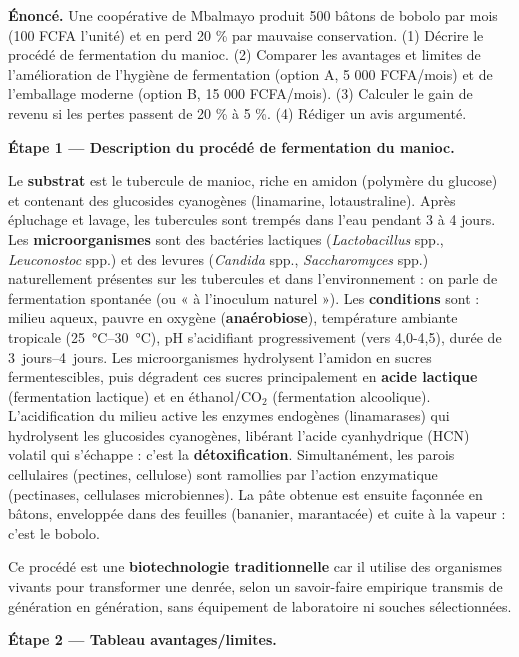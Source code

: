 \documentclass[11pt]{article}
\begin{document}
\begin{exoresolu}
\textbf{Énoncé.} Une coopérative de Mbalmayo produit 500 bâtons de bobolo par mois (100 FCFA l'unité) et en perd 20 \% par mauvaise conservation. (1) Décrire le procédé de fermentation du manioc. (2) Comparer les avantages et limites de l'amélioration de l'hygiène de fermentation (option A, 5 000 FCFA/mois) et de l'emballage moderne (option B, 15 000 FCFA/mois). (3) Calculer le gain de revenu si les pertes passent de 20 \% à 5 \%. (4) Rédiger un avis argumenté.

\tcblower

\textbf{Étape 1 — Description du procédé de fermentation du manioc.}

Le \textbf{substrat} est le tubercule de manioc, riche en amidon (polymère du glucose) et contenant des glucosides cyanogènes (linamarine, lotaustraline). Après épluchage et lavage, les tubercules sont trempés dans l'eau pendant 3 à 4 jours. Les \textbf{microorganismes} sont des bactéries lactiques (\emph{Lactobacillus} spp., \emph{Leuconostoc} spp.) et des levures (\emph{Candida} spp., \emph{Saccharomyces} spp.) naturellement présentes sur les tubercules et dans l'environnement : on parle de fermentation spontanée (ou « à l'inoculum naturel »). Les \textbf{conditions} sont : milieu aqueux, pauvre en oxygène (\textbf{anaérobiose}), température ambiante tropicale (\SIrange{25}{30}{\celsius}), pH s'acidifiant progressivement (vers 4,0-4,5), durée de \SIrange{3}{4}{jours}. Les microorganismes hydrolysent l'amidon en sucres fermentescibles, puis dégradent ces sucres principalement en \textbf{acide lactique} (fermentation lactique) et en éthanol/CO$_2$ (fermentation alcoolique). L'acidification du milieu active les enzymes endogènes (linamarases) qui hydrolysent les glucosides cyanogènes, libérant l'acide cyanhydrique (HCN) volatil qui s'échappe : c'est la \textbf{détoxification}. Simultanément, les parois cellulaires (pectines, cellulose) sont ramollies par l'action enzymatique (pectinases, cellulases microbiennes). La pâte obtenue est ensuite façonnée en bâtons, enveloppée dans des feuilles (bananier, marantacée) et cuite à la vapeur : c'est le bobolo.

Ce procédé est une \textbf{biotechnologie traditionnelle} car il utilise des organismes vivants pour transformer une denrée, selon un savoir-faire empirique transmis de génération en génération, sans équipement de laboratoire ni souches sélectionnées.

\textbf{Étape 2 — Tableau avantages/limites.}


\end{exoresolu}
\end{document}
